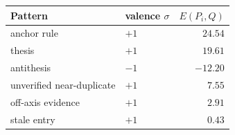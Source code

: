 \begin{tabular}{@{}llr@{}}
\toprule
Pattern & valence $\sigma$ & $E(P_i,Q)$ \\
\midrule
anchor rule & $+1$ & $24.54$ \\
thesis & $+1$ & $19.61$ \\
antithesis & $-1$ & $-12.20$ \\
unverified near-duplicate & $+1$ & $7.55$ \\
off-axis evidence & $+1$ & $2.91$ \\
stale entry & $+1$ & $0.43$ \\
\bottomrule
\end{tabular}
